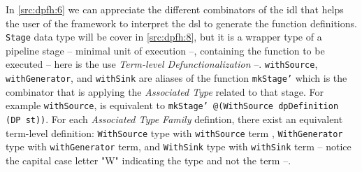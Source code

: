 In \autoref{src:dpfh:6} we can appreciate the different combinators of the \acrshort{idl} that helps the user of the framework to interpret the \acrshort{dsl} to generate the function definitions.
\texttt{Stage} data type will be cover in \autoref{src:dpfh:8}, but it is a wrapper type of a pipeline stage -- minimal unit of execution --, containing the function to be executed -- here is the use \emph{Term-level Defunctionalization} --.
\texttt{withSource}, \texttt{withGenerator}, and \texttt{withSink} are aliases of the function \texttt{mkStage'} which is the combinator that is applying the \emph{Associated Type} related to that stage. For example \texttt{withSource}, is equivalent to \texttt{mkStage' @(WithSource dpDefinition (DP st))}.
For each \emph{Associated Type Family} defintion, there exist an equivalent term-level definition: \texttt{WithSource} type with \texttt{withSource} term , \texttt{WithGenerator} type with \texttt{withGenerator} term, and \texttt{WithSink} type with \texttt{withSink} term -- notice the capital case letter "W" indicating the type and not the term --.

